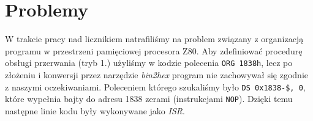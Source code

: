 \documentclass[fleqn]{article}
\begin{document}
\section{Problemy}
W trakcie pracy nad licznikiem natrafiliśmy na problem związany z organizacją programu w przestrzeni pamięciowej procesora Z80. Aby zdefiniować procedurę obsługi przerwania (tryb 1.) użyliśmy w kodzie polecenia \lstinline|ORG 1838h|, lecz po złożeniu i konwersji przez narzędzie \textit{bin2hex} program nie zachowywał się zgodnie z naszymi oczekiwaniami. Poleceniem którego szukaliśmy było \lstinline|DS 0x1838-$, 0|, które wypełnia bajty do adresu 1838 zerami (instrukcjami \lstinline|NOP|). Dzięki temu następne linie kodu były wykonywane jako \textit{ISR}.
\end{document}
